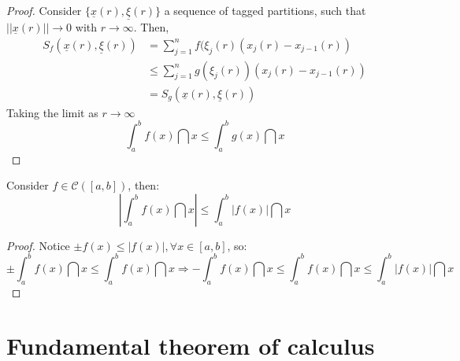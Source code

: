 \begin{proof}
    Consider $\{\underline{x}(r), \underline{\xi}(r)\}$ a sequence of tagged partitions, such that $||\underline{x}(r)|| \to 0$ with $r \to \infty$. Then,
    \begin{align*}
        S_f(\underline{x}(r), \underline{\xi}(r)) &= \sum \limits_{j=1}^n f(\xi_j(r)(x_j(r) - x_{j-1}(r)) \\
        &\leq \sum \limits_{j=1}^n g(\xi_j(r))(x_j(r) - x_{j-1}(r)) \\
        &=S_g(\underline{x}(r), \underline{\xi}(r))
    \end{align*}
    Taking the limit as $r \to \infty$
    \begin{equation*}
        \int_a^b f(x) \dint x \leq \int_a^b g(x) \dint x
    \end{equation*}
\end{proof}

\begin{theorem}
    Consider $f \in \mathcal{C}([a,b])$, then:
    \begin{equation*}
        \left |
            \int_a^b f(x) \dint x
        \right | \leq
        \int_a^b |f(x)| \dint x
    \end{equation*}
\end{theorem}

\begin{proof}
    Notice $\pm f(x) \leq |f(x)|, \forall x \in [a,b]$, so:
    \begin{equation*}
        \pm \int_a^b f(x) \dint x \leq \int_a^b f(x) \dint x \Longrightarrow -\int_a^b f(x) \dint x \leq \int_a^b f(x) \dint x \leq \int_a^b |f(x)| \dint x 
    \end{equation*}
\end{proof}

\section{Fundamental theorem of calculus}

